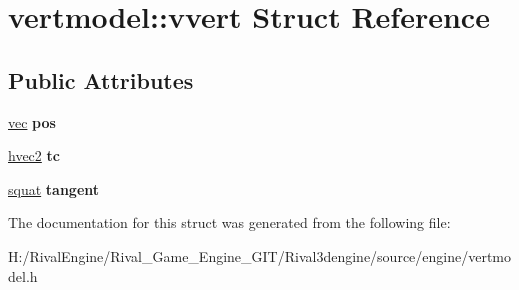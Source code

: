 \hypertarget{structvertmodel_1_1vvert}{}\section{vertmodel\+:\+:vvert Struct Reference}
\label{structvertmodel_1_1vvert}
\subsection*{Public Attributes}
\begin{DoxyCompactItemize}
\item 
\mbox{\label{structvertmodel_1_1vvert_a581d1a2f6e449f28e1c8eaf6c2386fc8}} 
\hyperlink{structvec}{vec} {\bfseries pos}
\item 
\mbox{\label{structvertmodel_1_1vvert_a2b6a7f784ae69873435ced3b2848997d}} 
\hyperlink{structhvec2}{hvec2} {\bfseries tc}
\item 
\mbox{\label{structvertmodel_1_1vvert_a4418964227fafbc4f35bd4db031107ea}} 
\hyperlink{structsquat}{squat} {\bfseries tangent}
\end{DoxyCompactItemize}


The documentation for this struct was generated from the following file\+:\begin{DoxyCompactItemize}
\item 
H\+:/\+Rival\+Engine/\+Rival\+\_\+\+Game\+\_\+\+Engine\+\_\+\+G\+I\+T/\+Rival3dengine/source/engine/vertmodel.\+h\end{DoxyCompactItemize}
